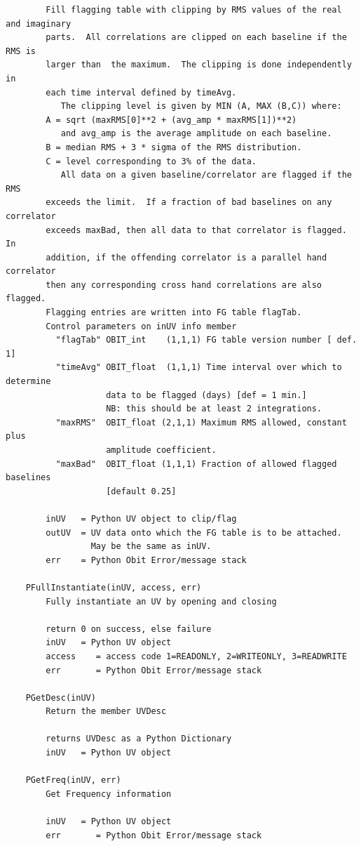 \documentclass[11pt]{report}
\begin{document}
\begin{verbatim}
        Fill flagging table with clipping by RMS values of the real and imaginary
        parts.  All correlations are clipped on each baseline if the RMS is
        larger than  the maximum.  The clipping is done independently in
        each time interval defined by timeAvg. 
           The clipping level is given by MIN (A, MAX (B,C)) where:
        A = sqrt (maxRMS[0]**2 + (avg_amp * maxRMS[1])**2)
           and avg_amp is the average amplitude on each baseline.
        B = median RMS + 3 * sigma of the RMS distribution.
        C = level corresponding to 3% of the data.
           All data on a given baseline/correlator are flagged if the RMS
        exceeds the limit.  If a fraction of bad baselines on any correlator
        exceeds maxBad, then all data to that correlator is flagged.  In
        addition, if the offending correlator is a parallel hand correlator
        then any corresponding cross hand correlations are also flagged.
        Flagging entries are written into FG table flagTab.
        Control parameters on inUV info member
          "flagTab" OBIT_int    (1,1,1) FG table version number [ def. 1]
          "timeAvg" OBIT_float  (1,1,1) Time interval over which to determine 
                    data to be flagged (days) [def = 1 min.]
                    NB: this should be at least 2 integrations.
          "maxRMS"  OBIT_float (2,1,1) Maximum RMS allowed, constant plus 
                    amplitude coefficient. 
          "maxBad"  OBIT_float (1,1,1) Fraction of allowed flagged baselines 
                    [default 0.25]
        
        inUV   = Python UV object to clip/flag
        outUV  = UV data onto which the FG table is to be attached.
                 May be the same as inUV.
        err    = Python Obit Error/message stack
    
    PFullInstantiate(inUV, access, err)
        Fully instantiate an UV by opening and closing
        
        return 0 on success, else failure
        inUV   = Python UV object
        access    = access code 1=READONLY, 2=WRITEONLY, 3=READWRITE
        err       = Python Obit Error/message stack
    
    PGetDesc(inUV)
        Return the member UVDesc
        
        returns UVDesc as a Python Dictionary
        inUV   = Python UV object
    
    PGetFreq(inUV, err)
        Get Frequency information
        
        inUV   = Python UV object
        err       = Python Obit Error/message stack
    

\end{verbatim}
\end{document}
